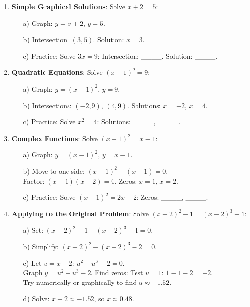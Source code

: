 \documentclass[12pt]{article}
\begin{document}
\begin{enumerate}[label=19.\arabic*]
    \item \textbf{Simple Graphical Solutions}: Solve \( x + 2 = 5 \):
    \begin{enumerate}
        \item[a)] Graph: \( y = x + 2 \), \( y = 5 \).
        \item[b)] Intersection: \( (3, 5) \). Solution: \( x = 3 \).
        \item[c)] Practice: Solve \( 3x = 9 \): Intersection: \_\_\_\_. Solution: \_\_\_\_.
    \end{enumerate}
    \item \textbf{Quadratic Equations}: Solve \( (x - 1)^2 = 9 \):
    \begin{enumerate}
        \item[a)] Graph: \( y = (x - 1)^2 \), \( y = 9 \).
        \item[b)] Intersections: \( (-2, 9) \), \( (4, 9) \). Solutions: \( x = -2 \), \( x = 4 \).
        \item[c)] Practice: Solve \( x^2 = 4 \): Solutions: \_\_\_\_, \_\_\_\_.
    \end{enumerate}
    \item \textbf{Complex Functions}: Solve \( (x - 1)^2 = x - 1 \):
    \begin{enumerate}
        \item[a)] Graph: \( y = (x - 1)^2 \), \( y = x - 1 \).
        \item[b)] Move to one side: \( (x - 1)^2 - (x - 1) = 0 \). \\
        Factor: \( (x - 1)(x - 2) = 0 \). Zeros: \( x = 1 \), \( x = 2 \).
        \item[c)] Practice: Solve \( (x - 1)^2 = 2x - 2 \): Zeros: \_\_\_\_, \_\_\_\_.
    \end{enumerate}
    \item \textbf{Applying to the Original Problem}: Solve \( (x - 2)^2 - 1 = (x - 2)^3 + 1 \):
    \begin{enumerate}
        \item[a)] Set: \( (x - 2)^2 - 1 - (x - 2)^3 - 1 = 0 \).
        \item[b)] Simplify: \( (x - 2)^2 - (x - 2)^3 - 2 = 0 \).
        \item[c)] Let \( u = x - 2 \): \( u^2 - u^3 - 2 = 0 \). \\
        Graph \( y = u^2 - u^3 - 2 \). Find zeros: Test \( u = 1 \): \( 1 - 1 - 2 = -2 \). \\
        Try numerically or graphically to find \( u \approx -1.52 \).
        \item[d)] Solve: \( x - 2 \approx -1.52 \), so \( x \approx 0.48 \).
    \end{enumerate}
\end{enumerate}
\end{document}
